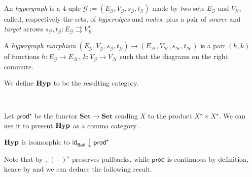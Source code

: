 \documentclass[3p]{elsarticle}
\newcommand{\Set}{\mathbf{Set}}
\def\E{\textbf {\textup{E}}}
\newcommand{\catname}[1]{\textbf{\textup{#1}}}
\newcommand{\hyp}{\catname{Hyp}}
\newcommand{\pro}{\mathsf{prod}}
\renewcommand{\comma}[2]{#1\hspace{1pt} {\downarrow}#2}
\newcommand{\id}[1]{\mathsf{id}_{#1}}
\theoremstyle{remark}
\theoremstyle{definition}
\begin{document}
\noindent
\begin{minipage}[l]{.83\linewidth}
	\setlength{\parindent}{1.5em}
	\begin{defi}An \emph{hypergraph} is a 4-uple $\mathcal{G}:=(E_\mathcal{G}, V_\mathcal{G}, s_\mathcal{G}, t_\mathcal{G})$ made by two sets $E_\mathcal{G}$ and $V_\mathcal{G}$, called, respectively the sets, of \emph{hyperedges} and \emph{nodes}, plus a pair of \emph{source} and \emph{target} arrows  $s_\mathcal{G}, t_\mathcal{G}\colon E_\mathcal{G}\rightrightarrows V_\mathcal{G}^\star$. 
		
A \emph{hypergraph morphism} $(E_\mathcal{G}, V_\mathcal{G}, s_\mathcal{G}, t_\mathcal{G})\to (E_\mathcal{H}, V_\mathcal{H}, s_\mathcal{H}, t_\mathcal{H})$ is a pair $(h,k)$ of functions $h\colon E_\mathcal{G}\to E_\mathcal{H}$, $k\colon V_\mathcal{G}\to V_\mathcal{H}$ such that the diagrams on the right commute.

We define $\hyp$ to be the resulting category.
\end{defi}\end{minipage} \hfill 
\begin{minipage}[r]{.15\linewidth}
 \hspace{1pt}\\  
\end{minipage}

Let $\pro^\star$ be the functor $\Set\to \Set$ sending $X$ to the product $X^\star\times X^\star$.  We can use it to present $\hyp$ as a comma category \cite[Prop.~$6.2.2$]{castelnovo2023thesis}.

\begin{prop}\label{prop:com}
	$\hyp$ is isomorphic to $\comma{\id{\Set}}{\pro^\star}$
\end{prop}

Note that by , $(-)^\star$ preserves pullbacks, while $\pro$ is continuous by definition, 
hence by  and  we can deduce the following result.


\end{document}
